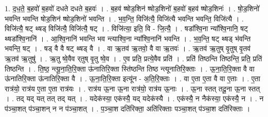 \documentclass[17pt]{extarticle}
\begin{document}
1. द॒ध॒ते॒ ब॒हवो॑ ब॒हवो॑ दधते दधते ब॒हवः॑ । . ब॒हव॑ ष्षोड॒शिन॑ ष्षोड॒शिनो॑ ब॒हवो॑ ब॒हव॑ ष्षोड॒शिनः॑ । . षो॒ड॒शिनो॑ भवन्ति भवन्ति षोड॒शिन॑ ष्षोड॒शिनो॑ भवन्ति । . भ॒व॒न्ति॒ विजि॑त्यै॒ विजि॑त्यै भवन्ति भवन्ति॒ विजि॑त्यै । . विजि॑त्यै॒ षट् थ्षड् विजि॑त्यै॒ विजि॑त्यै॒ षट् । . विजि॑त्या॒ इति॒ वि - जि॒त्यै॒ । . षडा᳚श्वि॒ना न्या᳚श्वि॒नानि॒ षट् थ्षडा᳚श्वि॒नानि॑ । . आ॒श्वि॒नानि॑ भवन्ति भव न्त्याश्वि॒ना न्या᳚श्वि॒नानि॑ भवन्ति । . भ॒व॒न्ति॒ षट् थ्षड् भ॑वन्ति भवन्ति॒ षट् । . षड् वै वै षट् थ्षड् वै । . वा ऋ॒तव॑ ऋ॒तवो॒ वै वा ऋ॒तवः॑ । . ऋ॒तव॑ ऋ॒तुष् वृ॒तुष् वृ॒तव॑ ऋ॒तव॑ ऋ॒तुषु॑ । . ऋ॒तु ष्वे॒वैव र्‌तुष् वृ॒तु ष्वे॒व । . ए॒व प्रति॒ प्रत्ये॒वैव प्रति॑ । . प्रति॑ तिष्ठन्ति तिष्ठन्ति॒ प्रति॒ प्रति॑ तिष्ठन्ति । . ति॒ष्ठ॒ न्त्यू॒ना॒ति॒रि॒क्ता ऊ॑नातिरि॒क्ता स्ति॑ष्ठन्ति तिष्ठ न्त्यूनातिरि॒क्ताः । . ऊ॒ना॒ति॒रि॒क्ता वै वा ऊ॑नातिरि॒क्ता ऊ॑नातिरि॒क्ता वै । . ऊ॒ना॒ति॒रि॒क्ता इत्यू॑न - अ॒ति॒रि॒क्ताः । . वा ए॒ता ए॒ता वै वा ए॒ताः । . ए॒ता रात्र॑यो॒ रात्र॑य ए॒ता ए॒ता रात्र॑यः । . रात्र॑य ऊ॒ना ऊ॒ना रात्र॑यो॒ रात्र॑य ऊ॒नाः । . ऊ॒ना स्तत् तदू॒ना ऊ॒ना स्तत् । . तद् यद् यत् तत् तद् यत् । . यदेक॑स्या॒ एक॑स्यै॒ यद् यदेक॑स्यै । . एक॑स्यै॒ न नैक॑स्या॒ एक॑स्यै॒ न । . न प॑ञ्चा॒शत् प॑ञ्चा॒शन् न न प॑ञ्चा॒शत् । . प॒ञ्चा॒श दति॑रिक्ता॒ अति॑रिक्ताः पञ्चा॒शत् प॑ञ्चा॒श दति॑रिक्ताः । \newline
\end{document}
